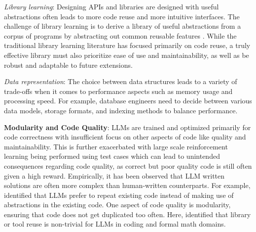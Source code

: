 \textit{Library learning}: Designing APIs and libraries are designed with useful abstractions often leads to more code reuse and more intuitive interfaces. The challenge of library learning is to derive a library of useful abstractions from a corpus of programs by abstracting out common reusable features \citep{ellis2021dreamcoder,10.5555/3692070.3693967,10.1145/3571234}. While the traditional library learning literature has focused primarily on code reuse, a truly effective library must also prioritize ease of use and maintainability, as well as be robust and adaptable to future extensions. %

\textit{Data representation}: The choice between data structures leads to a variety of trade-offs when it comes to performance aspects such as memory usage and processing speed. For example, database engineers need to decide between various data models, storage formats, and indexing methods to balance performance. 

\textbf{Modularity and Code Quality}: %
LLMs are trained and optimized primarily for code correctness with insufficient focus on other aspects of code like quality and maintainability. This is further exacerbated with large scale reinforcement learning being performed using test cases which can lead to unintended consequences regarding code quality, as correct but poor quality code is still often given a high reward.
Empirically, it has been observed that LLM written solutions are often more complex than human-written counterparts. 
For example, \citet{jain2024r2e} identified that LLMs prefer to repeat existing code instead of making use of abstractions in the existing code. 
One aspect of code quality is modularity, ensuring that code does not get duplicated too often. Here, \citet{berlot2024library} identified that library or tool reuse is non-trivial for LLMs in coding and formal math domains. 



